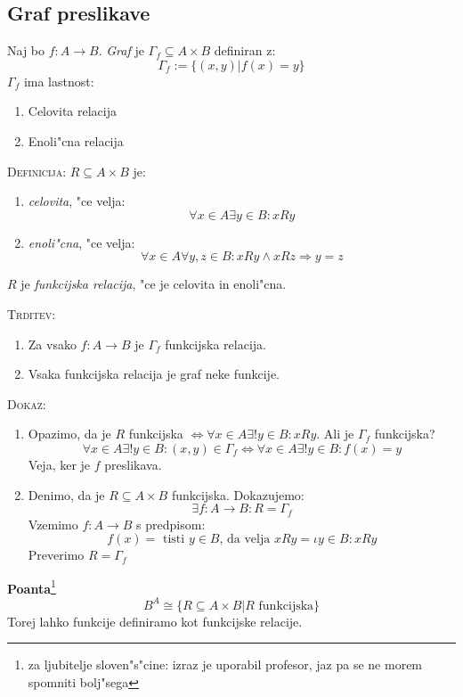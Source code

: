 \subsection{Graf preslikave}
Naj bo $f: A \to B$. \emph{Graf} je $\Gamma_f \subseteq A \times B$ definiran z:
\begin{equation*}
\Gamma_f := \{(x, y)| f(x) = y\}
\end{equation*}
$\Gamma_f$ ima lastnost:
\begin{enumerate}
	\item Celovita relacija
	\item Enoli"cna relacija
\end{enumerate}
\textsc{Definicija:} $R \subseteq A \times B$ je:
\begin{enumerate}
	\item \emph{celovita}, "ce velja:
	\begin{equation*}
	\forall x \in A \exists y \in B: x R y
	\end{equation*}
	
	\item \emph{enoli"cna}, "ce velja:
	\begin{equation*}
	\forall x \in A \forall y, z \in B: x R y \land x R z \Rightarrow y = z
	\end{equation*}
\end{enumerate}
$R$ je \emph{funkcijska relacija}, "ce je celovita in enoli"cna.

\textsc{Trditev:}
\begin{enumerate}
	\item Za vsako $f: A \to B$ je $\Gamma_f$ funkcijska relacija.
	\item Vsaka funkcijska relacija je graf neke funkcije.
\end{enumerate}
\textsc{Dokaz:}
\begin{enumerate}
	\item Opazimo, da je $R$ funkcijska $\iff \forall x \in A \exists! y \in B: x R y$. Ali je $\Gamma_f$ funkcijska?
	\begin{equation*}
	\forall x \in A \exists! y \in B: (x, y) \in \Gamma_f \iff \forall x \in A \exists! y \in B: f(x) = y
	\end{equation*}
	Veja, ker je $f$ preslikava.
	
	\item Denimo, da je $R \subseteq A \times B$ funkcijska. Dokazujemo:
	\begin{equation*}
	\exists f : A \to B: R = \Gamma_f
	\end{equation*}
	Vzemimo $f: A \to B$ s predpisom:
	\begin{equation*}
	f(x) = \text{ tisti $y \in B$, da velja $x R y$} = \iota y \in B: x R y
	\end{equation*}
	Preverimo $R = \Gamma_f$
\end{enumerate}

\textbf{Poanta}\footnote{za ljubitelje sloven"s"cine: izraz je uporabil profesor, jaz pa se ne morem spomniti bolj"sega}
\begin{equation*}
B^A \cong \{R \subseteq A \times B | R \text{ funkcijska}\}
\end{equation*}
Torej lahko funkcije definiramo kot funkcijske relacije.
